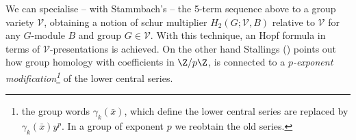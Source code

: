 \medskip
We can specialise -- with Stammbach's \cite[\S III]{stahom} -- the 5-term sequence above to a group variety $\mathcal{V}$, obtaining
a notion of schur multiplier $H_{2}(G;\mathcal{V},B)$ relative to $\mathcal{V}$ for any $G$-module $B$ and group $G\in\mathcal{V}$.
With this technique, an Hopf formula in terms of $\mathcal{V}$-presentations is achieved. %
On the other hand Stallings (\cite[Theorem 2.1]{stall}) points out how group homology with coefficients in $\Z/p\Z$,
is connected to a {\em $p$-exponent modification\footnote{
the group words $\gamma_{k}(\bar x)$, which define the lower central series are replaced by $\gamma_{k}(\bar x)y^{p}$. In a group
of exponent $p$ we reobtain the old series.}} of the lower central series. 

